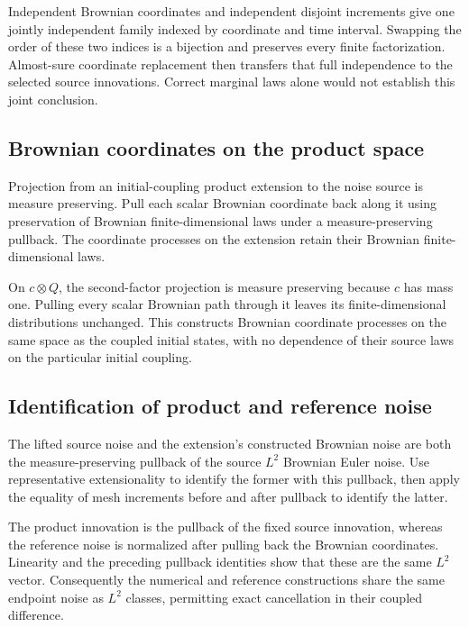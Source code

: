 \documentclass[11pt,a4paper]{report}
\begin{document}
Independent Brownian coordinates and independent disjoint increments give one jointly independent family indexed by coordinate and time interval. Swapping the order of these two indices is a bijection and preserves every finite factorization. Almost-sure coordinate replacement then transfers that full independence to the selected source innovations. Correct marginal laws alone would not establish this joint conclusion.

\subsection{\texorpdfstring{Brownian coordinates on the product space}{Brownian coordinates on the product space}}
\label{report-step-UnadjustedLangevin-ProductBrownian-lean-12}


Projection from an initial-coupling product extension to the noise source is measure preserving. Pull each scalar Brownian coordinate back along it using preservation of Brownian finite-dimensional laws under a measure-preserving pullback. The coordinate processes on the extension retain their Brownian finite-dimensional laws.



On \(c\otimes Q\), the second-factor projection is measure preserving because \(c\) has mass one. Pulling every scalar Brownian path through it leaves its finite-dimensional distributions unchanged. This constructs Brownian coordinate processes on the same space as the coupled initial states, with no dependence of their source laws on the particular initial coupling.

\subsection{\texorpdfstring{Identification of product and reference noise}{Identification of product and reference noise}}
\label{report-step-UnadjustedLangevin-ProductBrownian-lean-13}


The lifted source noise and the extension's constructed Brownian noise are both the measure-preserving pullback of the source \(L^2\) Brownian Euler noise. Use representative extensionality to identify the former with this pullback, then apply the equality of mesh increments before and after pullback to identify the latter.



The product innovation is the pullback of the fixed source innovation, whereas the reference noise is normalized after pulling back the Brownian coordinates. Linearity and the preceding pullback identities show that these are the same \(L^2\) vector. Consequently the numerical and reference constructions share the same endpoint noise as \(L^2\) classes, permitting exact cancellation in their coupled difference.
\end{document}
